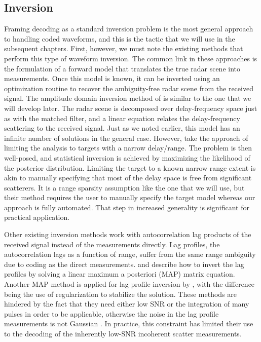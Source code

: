 \subsection{Inversion}
Framing decoding as a standard inversion problem is the most general approach to handling coded waveforms, and this is the tactic that we will use in the subsequent chapters. First, however, we must note the existing methods that perform this type of waveform inversion. The common link in these approaches is the formulation of a forward model that translates the true radar scene into measurements. Once this model is known, it can be inverted using an optimization routine to recover the ambiguity-free radar scene from the received signal. The amplitude domain inversion method of \textcite{VLV08} is similar to the one that we will develop later. The radar scene is decomposed over delay-frequency space just as with the matched filter, and a linear equation relates the delay-frequency scattering to the received signal. Just as we noted earlier, this model has an infinite number of solutions in the general case. However, \textcite{VLV08} take the approach of limiting the analysis to targets with a narrow delay/range. The problem is then well-posed, and statistical inversion is achieved by maximizing the likelihood of the posterior distribution. Limiting the target to a known narrow range extent is akin to manually specifying that most of the delay space is free from significant scatterers. It is a range sparsity assumption like the one that we will use, but their method requires the user to manually specify the target model whereas our approach is fully automated. That step in increased generality is significant for practical application.

Other existing inversion methods work with autocorrelation lag products of the received signal instead of the measurements directly. Lag profiles, the autocorrelation lags as a function of range, suffer from the same range ambiguity due to coding as the direct measurements. \textcite{DLN04} and \textcite{VLN+08} describe how to invert the lag profiles by solving a linear maximum a posteriori (MAP) matrix equation. Another MAP method is applied for lag profile inversion by \textcite{NKKS08}, with the difference being the use of regularization to stabilize the solution. These methods are hindered by the fact that they need either low SNR or the integration of many pulses in order to be applicable, otherwise the noise in the lag profile measurements is not Gaussian \autocite{LVV08}. In practice, this constraint has limited their use to the decoding of the inherently low-SNR incoherent scatter measurements.